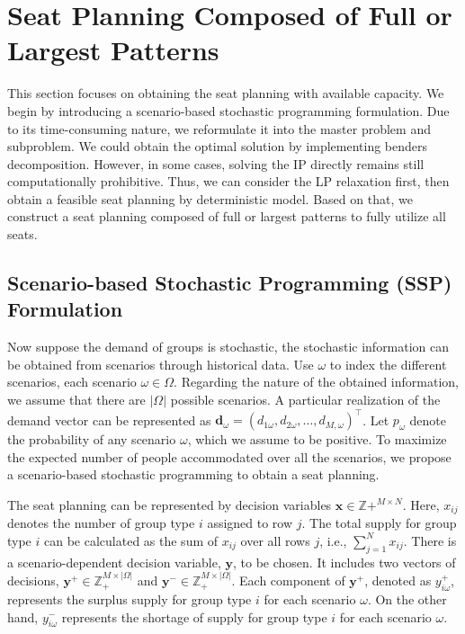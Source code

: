 
\section{Seat Planning Composed of Full or Largest Patterns}
This section focuses on obtaining the seat planning with available capacity. We begin by introducing a scenario-based stochastic programming formulation. Due to its time-consuming nature, we reformulate it into the master problem and subproblem. We could obtain the optimal solution by implementing benders decomposition. However, in some cases, solving the IP directly remains still computationally prohibitive. Thus, we can consider the LP relaxation first, then obtain a feasible seat planning by deterministic model. Based on that, we construct a seat planning composed of full or largest patterns to fully utilize all seats.


\subsection{Scenario-based Stochastic Programming (SSP) Formulation}
Now suppose the demand of groups is stochastic, the stochastic information can be obtained from scenarios through historical data. Use $\omega$ to index the different scenarios, each scenario $\omega \in \Omega$. Regarding the nature of the obtained information, we assume that there are $|\Omega|$ possible scenarios. A particular realization of the demand vector can be represented as $\mathbf{d}_\omega = (d_{1\omega},d_{2\omega},\ldots,d_{M,\omega})^{\intercal}$. Let $p_{\omega}$ denote the probability of any scenario $\omega$, which we assume to be positive. To maximize the expected number of people accommodated over all the scenarios, we propose a scenario-based stochastic programming to obtain a seat planning.

The seat planning can be represented by decision variables $\mathbf{x} \in \mathbb{Z}{+}^{M \times N}$. Here, $x_{ij}$ denotes the number of group type $i$ assigned to row $j$. The total supply for group type $i$ can be calculated as the sum of $x_{ij}$ over all rows $j$, i.e., $\sum_{j=1}^N x_{ij}$. There is a scenario-dependent decision variable, $\mathbf{y}$, to be chosen. It includes two vectors of decisions, $\mathbf{y}^{+} \in \mathbb{Z}_{+}^{M \times |\Omega|}$ and $\mathbf{y}^{-} \in \mathbb{Z}_{+}^{M \times |\Omega|}$. Each component of $\mathbf{y}^{+}$, denoted as $y_{i\omega}^{+}$, represents the surplus supply for group type $i$ for each scenario $\omega$. On the other hand, $y_{i\omega}^{-}$ represents the shortage of supply for group type $i$ for each scenario $\omega$.

